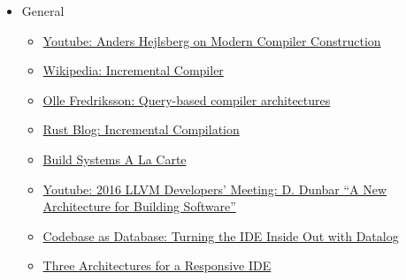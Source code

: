 \documentclass[12pt, a4paper]{report}
\begin{document}
  \begin{itemize}[noitemsep]

  \item General

    \begin{itemize}[noitemsep]

      \item \href{https://www.youtube.com/watch?v=wSdV1M7n4gQ}{\CheckedBox Youtube: Anders Hejlsberg on Modern Compiler Construction} \cite{hejlsberg_modern_compiler_construction}
      \item \href{https://en.wikipedia.org/wiki/Incremental_compiler}{\CheckedBox Wikipedia: Incremental Compiler} \cite{wiki_incremental_compiler}
      \item \href{https://ollef.github.io/blog/posts/query-based-compilers.html}{\CheckedBox Olle Fredriksson: Query-based compiler architectures} \cite{olle_query_based}
      \item \href{https://blog.rust-lang.org/2016/09/08/incremental.html}{\CheckedBox Rust Blog: Incremental Compilation} \cite{rust_blog_incremental_compilation}
      \item \href{https://www.microsoft.com/en-us/research/publication/build-systems-la-carte/}{\Square Build Systems A La Carte} \cite{mokhov2018build}
      \item \href{https://www.youtube.com/watch?v=b_T-eCToX1I}{\CheckedBox Youtube: 2016 LLVM Developers’ Meeting: D. Dunbar “A New Architecture for Building Software”} \cite{dunbar2016}
      \item \href{https://petevilter.me/post/datalog-typechecking/}{\Square Codebase as Database: Turning the IDE Inside Out with Datalog}
      \item \href{https://rust-analyzer.github.io/blog/2020/07/20/three-architectures-for-responsive-ide.html}{\Square Three Architectures for a Responsive IDE}





\end{itemize}
\end{itemize}
\end{document}
